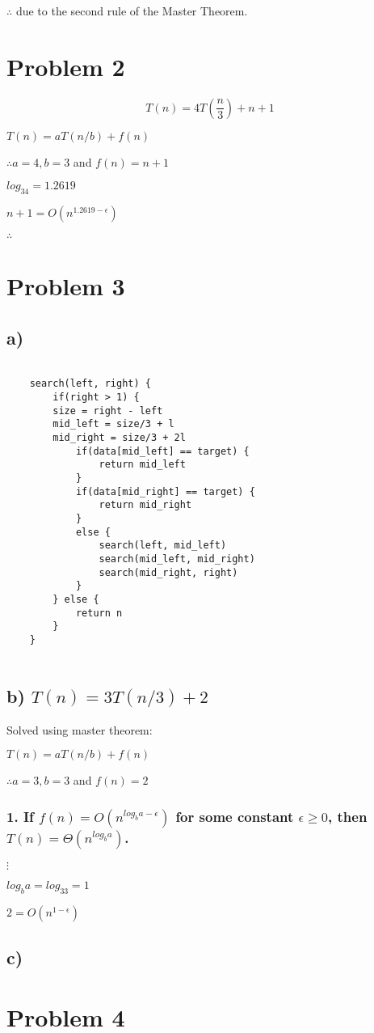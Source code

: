\documentclass{article}
\begin{document}
$\therefore$  due to the second rule of the Master Theorem.

\section*{Problem 2}

\[T(n) = 4T(\frac{n}{3}) + n + 1\]

$T(n) = aT(n/b) + f(n)$

$\therefore a = 4, b = 3$ and $f(n) = n + 1$

$log_34 = 1.2619$

$n + 1 = O(n^{1.2619 - \epsilon})$

$\therefore$ 

\section*{Problem 3}

\subsection*{a)}

\begin{verbatim}

    search(left, right) {
        if(right > 1) {
        size = right - left
        mid_left = size/3 + l
        mid_right = size/3 + 2l
            if(data[mid_left] == target) {
                return mid_left
            }
            if(data[mid_right] == target) {
                return mid_right
            }
            else {
                search(left, mid_left)
                search(mid_left, mid_right)
                search(mid_right, right)
            }
        } else {
            return n
        }
    }
    
\end{verbatim}

\subsection*{b) $T(n) = 3T(n/3) + 2$}

Solved using master theorem:

$T(n) = aT(n/b) + f(n)$

$\therefore a = 3, b = 3$ and $f(n) = 2$

\subsubsection*{1. If $f(n) = O(n^{log_ba - \epsilon})$ for some constant $\epsilon \geq  0$, then $T(n) = \Theta(n^{log_ba})$.}

$\vdots$

$log_ba = log_33 = 1$

$2 = O(n^{1 - \epsilon})$

\therefore {}

\subsection*{c)}

\section*{Problem 4}
\end{document}
